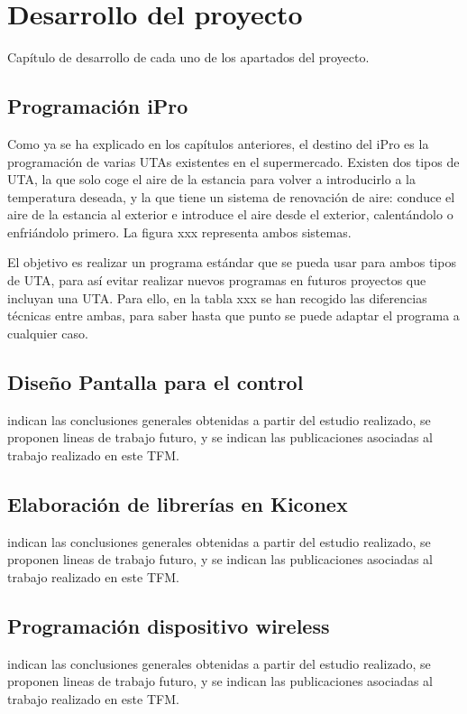 
\cleardoublepage
\chapter{Desarrollo del proyecto}

\label{chap:desarrolloProyecto} %

Capítulo de desarrollo de cada uno de los apartados del proyecto.


\section{Programación iPro}
\label{sec:programacionipro}
Como ya se ha explicado en los capítulos anteriores, el destino del iPro es la programación de varias UTAs existentes en el supermercado. Existen dos tipos de UTA, la que solo coge el aire de la estancia para volver a introducirlo a la temperatura deseada, y la que tiene un sistema de renovación de aire: conduce el aire de la estancia al exterior e introduce el aire desde el exterior, calentándolo o enfriándolo primero. La figura xxx representa ambos sistemas.

El objetivo es realizar un programa estándar que se pueda usar para ambos tipos de UTA, para así evitar realizar nuevos programas en futuros proyectos que incluyan una UTA. Para ello, en la tabla xxx se han recogido las diferencias técnicas entre ambas, para saber hasta que punto se puede adaptar el programa a cualquier caso.

\section{Diseño Pantalla para el control}
\label{sec:programacionpantalla}
indican las conclusiones generales obtenidas a partir del estudio realizado, se proponen lineas de trabajo futuro, y se indican las publicaciones asociadas al trabajo realizado en este TFM.
\section{Elaboración de librerías en Kiconex}
\label{sec:librerias}
indican las conclusiones generales obtenidas a partir del estudio realizado, se proponen lineas de trabajo futuro, y se indican las publicaciones asociadas al trabajo realizado en este TFM.
\section{Programación dispositivo wireless}
\label{sec:programacionesp32}
indican las conclusiones generales obtenidas a partir del estudio realizado, se proponen lineas de trabajo futuro, y se indican las publicaciones asociadas al trabajo realizado en este TFM.